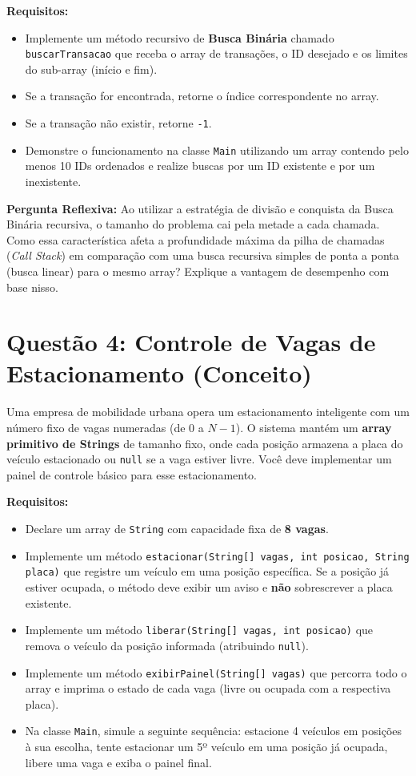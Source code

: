 \documentclass[12pt, a4paper]{article}
\begin{document}
\textbf{Requisitos:}
\begin{itemize}
    \item Implemente um método recursivo de \textbf{Busca Binária} chamado \texttt{buscarTransacao} que receba o array de transações, o ID desejado e os limites do sub-array (início e fim).
    \item Se a transação for encontrada, retorne o índice correspondente no array.
    \item Se a transação não existir, retorne \texttt{-1}.
    \item Demonstre o funcionamento na classe \texttt{Main} utilizando um array contendo pelo menos 10 IDs ordenados e realize buscas por um ID existente e por um inexistente.
\end{itemize}

\textbf{Pergunta Reflexiva:} Ao utilizar a estratégia de divisão e conquista da Busca Binária recursiva, o tamanho do problema cai pela metade a cada chamada. Como essa característica afeta a profundidade máxima da pilha de chamadas (\textit{Call Stack}) em comparação com uma busca recursiva simples de ponta a ponta (busca linear) para o mesmo array? Explique a vantagem de desempenho com base nisso.


\section*{Questão 4: Controle de Vagas de Estacionamento (Conceito)}
Uma empresa de mobilidade urbana opera um estacionamento inteligente com um número fixo de vagas numeradas (de 0 a $N-1$). O sistema mantém um \textbf{array primitivo de Strings} de tamanho fixo, onde cada posição armazena a placa do veículo estacionado ou \texttt{null} se a vaga estiver livre. Você deve implementar um painel de controle básico para esse estacionamento.

\textbf{Requisitos:}
\begin{itemize}
    \item Declare um array de \texttt{String} com capacidade fixa de \textbf{8 vagas}.
    \item Implemente um método \texttt{estacionar(String[] vagas, int posicao, String placa)} que registre um veículo em uma posição específica. Se a posição já estiver ocupada, o método deve exibir um aviso e \textbf{não} sobrescrever a placa existente.
    \item Implemente um método \texttt{liberar(String[] vagas, int posicao)} que remova o veículo da posição informada (atribuindo \texttt{null}).
    \item Implemente um método \texttt{exibirPainel(String[] vagas)} que percorra todo o array e imprima o estado de cada vaga (livre ou ocupada com a respectiva placa).
    \item Na classe \texttt{Main}, simule a seguinte sequência: estacione 4 veículos em posições à sua escolha, tente estacionar um 5º veículo em uma posição já ocupada, libere uma vaga e exiba o painel final.
\end{itemize}
\end{document}
